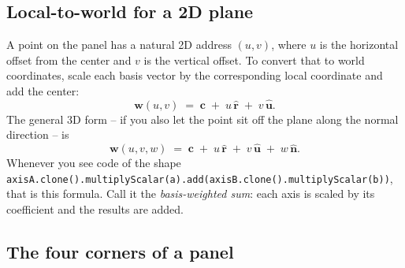 \documentclass{article}
\begin{document}
\begin{center}
\end{center}

\subsection{Local-to-world for a 2D plane}

A point on the panel has a natural 2D address $(u, v)$, where $u$ is the
horizontal offset from the center and $v$ is the vertical offset. To convert
that to world coordinates, scale each basis vector by the corresponding local
coordinate and add the center:
\[
    \mathbf{w}(u, v) \;=\; \mathbf{c} \;+\; u\,\hat{\mathbf{r}} \;+\; v\,\hat{\mathbf{u}}.
\]
The general 3D form -- if you also let the point sit off the plane along the
normal direction -- is
\[
    \mathbf{w}(u, v, w) \;=\; \mathbf{c} \;+\; u\,\hat{\mathbf{r}} \;+\; v\,\hat{\mathbf{u}} \;+\; w\,\hat{\mathbf{n}}.
\]
Whenever you see code of the shape
\verb|axisA.clone().multiplyScalar(a).add(axisB.clone().multiplyScalar(b))|,
that is this formula. Call it the \emph{basis-weighted sum}: each axis is
scaled by its coefficient and the results are added.

\subsection{The four corners of a panel}
\end{document}
